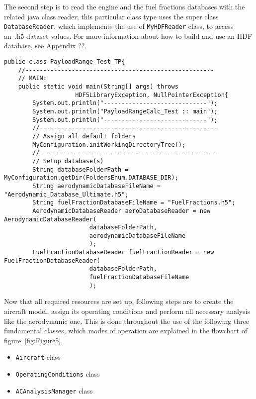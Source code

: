 The second step is to read the engine and the fuel fractions databases with the related java class reader; this particular class type uses the super class \lstinline[language=Java]!DatabaseReader!, which implements the use of \lstinline[language=Java]!MyHDFReader! class, to access an~.h5 dataset values. For more information about how to build and use an HDF database, see Appendix ??.

\bigskip
\begin{lstlisting}[caption={Excerpt of the ATR-72 Payload-Range test - preliminary steps}, captionpos=b, tabsize=2]
public class PayloadRange_Test_TP{
	//-----------------------------------------------------
	// MAIN:
	public static void main(String[] args) throws
					HDF5LibraryException, NullPointerException{
		System.out.println("-----------------------------");
		System.out.println("PayloadRangeCalc_Test :: main");
		System.out.println("-----------------------------");
		//--------------------------------------------------
		// Assign all default folders
		MyConfiguration.initWorkingDirectoryTree();
		//--------------------------------------------------
		// Setup database(s)	
		String databaseFolderPath = MyConfiguration.getDir(FoldersEnum.DATABASE_DIR);
		String aerodynamicDatabaseFileName = "Aerodynamic_Database_Ultimate.h5";
		String fuelFractionDatabaseFileName = "FuelFractions.h5";
		AerodynamicDatabaseReader aeroDatabaseReader = new AerodynamicDatabaseReader(
						databaseFolderPath,
						aerodynamicDatabaseFileName
						);
		FuelFractionDatabaseReader fuelFractionReader = new FuelFractionDatabaseReader(
						databaseFolderPath,
						fuelFractionDatabaseFileName
						);
\end{lstlisting}

Now that all required resources are set up, following steps are to create the aircraft model, assign its operating conditions and perform all necessary analysis like the aerodynamic one. This is done throughout the use of the following three fundamental classes, which modes of operation are explained in the flowchart of figure~\ref{fig:Figure5}.

\begin{itemize}
\item\lstinline[language=Java]!Aircraft! class
\item\lstinline[language=Java]!OperatingConditions! class
\item\lstinline[language=Java]!ACAnalysisManager! class
\end{itemize}

